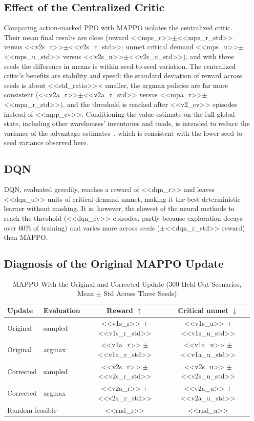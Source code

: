 \documentclass[conference]{IEEEtran}
\begin{document}
\subsection{Effect of the Centralized Critic}
Comparing action-masked PPO with MAPPO isolates the centralized critic. Their mean final results are close (reward <<mps_r>>$\pm$<<mps_r_std>> versus <<v2s_r>>$\pm$<<v2s_r_std>>; unmet critical demand <<mps_u>>$\pm$<<mps_u_std>> versus <<v2s_u>>$\pm$<<v2s_u_std>>), and with three seeds the difference in means is within seed-to-seed variation. The centralized critic's benefits are stability and speed: the standard deviation of reward across seeds is about <<std_ratio>>$\times$ smaller, the argmax policies are far more consistent (<<v2a_r>>$\pm$<<v2a_r_std>> versus <<mpa_r>>$\pm$<<mpa_r_std>>), and the threshold is reached after <<v2_cv>> episodes instead of <<mpp_cv>>. Conditioning the value estimate on the full global state, including other warehouses' inventories and roads, is intended to reduce the variance of the advantage estimates~\cite{b6}, which is consistent with the lower seed-to-seed variance observed here.

\subsection{DQN}
DQN, evaluated greedily, reaches a reward of <<dqn_r>> and leaves <<dqn_u>> units of critical demand unmet, making it the best deterministic learner without masking. It is, however, the slowest of the neural methods to reach the threshold (<<dqn_cv>> episodes, partly because exploration decays over 60\% of training) and varies more across seeds ($\pm$<<dqn_r_std>> reward) than MAPPO.

\subsection{Diagnosis of the Original MAPPO Update}

\begin{table}[htbp]
\caption{MAPPO With the Original and Corrected Update (300 Held-Out Scenarios, Mean $\pm$ Std Across Three Seeds)}
\label{tab:mappo}
\centering
\renewcommand{\arraystretch}{1.12}
\footnotesize
\begin{tabular}{llcc}
\toprule
\textbf{Update} & \textbf{Evaluation} & \textbf{Reward} $\uparrow$ & \textbf{Critical unmet} $\downarrow$ \\
\midrule
Original & sampled & <<v1s_r>> $\pm$ <<v1s_r_std>> & <<v1s_u>> $\pm$ <<v1s_u_std>> \\
Original & argmax & <<v1a_r>> $\pm$ <<v1a_r_std>> & <<v1a_u>> $\pm$ <<v1a_u_std>> \\
Corrected & sampled & <<v2s_r>> $\pm$ <<v2s_r_std>> & <<v2s_u>> $\pm$ <<v2s_u_std>> \\
Corrected & argmax & <<v2a_r>> $\pm$ <<v2a_r_std>> & <<v2a_u>> $\pm$ <<v2a_u_std>> \\
\midrule
\multicolumn{2}{l}{Random feasible} & <<rnd_r>> & <<rnd_u>> \\
\bottomrule
\end{tabular}
\end{table}
\end{document}
